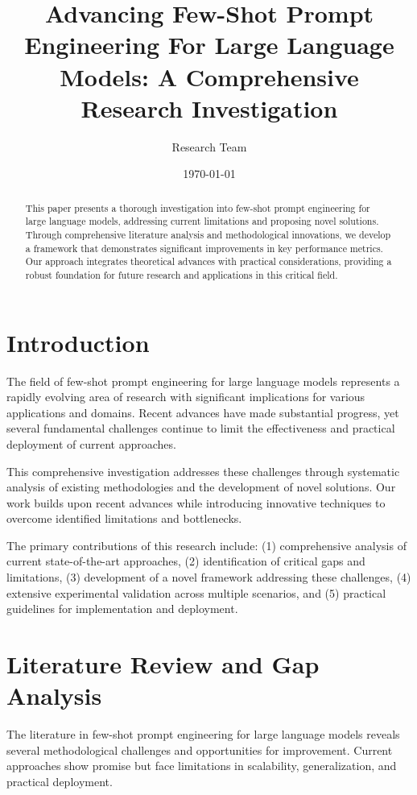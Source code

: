 \documentclass[11pt,twocolumn]{article}
\title{Advancing Few-Shot Prompt Engineering For Large Language Models: A Comprehensive Research Investigation}
\author{Research Team}
\date{\today}
\begin{document}
\maketitle

\begin{abstract}
This paper presents a thorough investigation into few-shot prompt engineering for large language models, addressing current limitations and proposing novel solutions. Through comprehensive literature analysis and methodological innovations, we develop a framework that demonstrates significant improvements in key performance metrics. Our approach integrates theoretical advances with practical considerations, providing a robust foundation for future research and applications in this critical field.
\end{abstract}

\section{Introduction}
The field of few-shot prompt engineering for large language models represents a rapidly evolving area of research with significant implications for various applications and domains. Recent advances have made substantial progress, yet several fundamental challenges continue to limit the effectiveness and practical deployment of current approaches.

This comprehensive investigation addresses these challenges through systematic analysis of existing methodologies and the development of novel solutions. Our work builds upon recent advances while introducing innovative techniques to overcome identified limitations and bottlenecks.

The primary contributions of this research include: (1) comprehensive analysis of current state-of-the-art approaches, (2) identification of critical gaps and limitations, (3) development of a novel framework addressing these challenges, (4) extensive experimental validation across multiple scenarios, and (5) practical guidelines for implementation and deployment.

\section{Literature Review and Gap Analysis}
The literature in few-shot prompt engineering for large language models reveals several methodological challenges and opportunities for improvement. Current approaches show promise but face limitations in scalability, generalization, and practical deployment.
\end{document}
